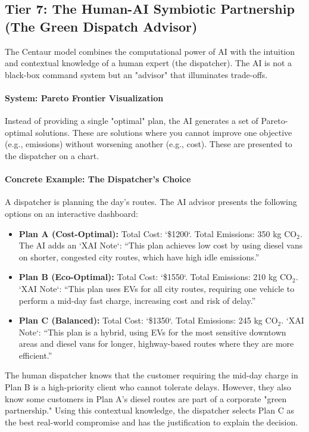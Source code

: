 \documentclass{article}
\begin{document}
\begin{enumerate}
\subsection{Tier 7: The Human-AI Symbiotic Partnership (The Green Dispatch Advisor)}
The Centaur model combines the computational power of AI with the intuition and contextual knowledge of a human expert (the dispatcher). The AI is not a black-box command system but an "advisor" that illuminates trade-offs.

\paragraph{System: Pareto Frontier Visualization}
Instead of providing a single "optimal" plan, the AI generates a set of Pareto-optimal solutions. These are solutions where you cannot improve one objective (e.g., emissions) without worsening another (e.g., cost). These are presented to the dispatcher on a chart.

\paragraph{Concrete Example: The Dispatcher's Choice}
A dispatcher is planning the day's routes. The AI advisor presents the following options on an interactive dashboard:
\begin{itemize}
    \item \textbf{Plan A (Cost-Optimal):} Total Cost: `\$1200`. Total Emissions: 350 kg CO$_2$. The AI adds an `XAI Note`: ``This plan achieves low cost by using diesel vans on shorter, congested city routes, which have high idle emissions.''
    \item \textbf{Plan B (Eco-Optimal):} Total Cost: `\$1550`. Total Emissions: 210 kg CO$_2$. `XAI Note`: ``This plan uses EVs for all city routes, requiring one vehicle to perform a mid-day fast charge, increasing cost and risk of delay.''
    \item \textbf{Plan C (Balanced):} Total Cost: `\$1350`. Total Emissions: 245 kg CO$_2$. `XAI Note`: ``This plan is a hybrid, using EVs for the most sensitive downtown areas and diesel vans for longer, highway-based routes where they are more efficient.''
\end{itemize}
The human dispatcher knows that the customer requiring the mid-day charge in Plan B is a high-priority client who cannot tolerate delays. However, they also know some customers in Plan A's diesel routes are part of a corporate "green partnership." Using this contextual knowledge, the dispatcher selects Plan C as the best real-world compromise and has the justification to explain the decision.


\end{enumerate}
\end{document}
